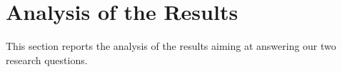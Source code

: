 
\section{Analysis of the Results}

This section reports the analysis of the results aiming at answering our two research questions.




